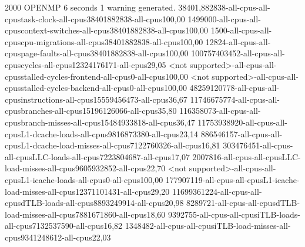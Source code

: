 
2000
OPENMP
6 seconds
1 warning generated.
38401,882838-all-cpus-all-cpustask-clock-all-cpus38401882838-all-cpus100,00
1499000-all-cpus-all-cpuscontext-switches-all-cpus38401882838-all-cpus100,00
1500-all-cpus-all-cpuscpu-migrations-all-cpus38401882838-all-cpus100,00
12824-all-cpus-all-cpuspage-faults-all-cpus38401882838-all-cpus100,00
100757403452-all-cpus-all-cpuscycles-all-cpus12324176171-all-cpus29,05
<not supported>-all-cpus-all-cpusstalled-cycles-frontend-all-cpus0-all-cpus100,00
<not supported>-all-cpus-all-cpusstalled-cycles-backend-all-cpus0-all-cpus100,00
48259120778-all-cpus-all-cpusinstructions-all-cpus15559456473-all-cpus36,67
11746675774-all-cpus-all-cpusbranches-all-cpus15196126066-all-cpus35,80
116358073-all-cpus-all-cpusbranch-misses-all-cpus15484933818-all-cpus36,47
11753938920-all-cpus-all-cpusL1-dcache-loads-all-cpus9816873380-all-cpus23,14
886546157-all-cpus-all-cpusL1-dcache-load-misses-all-cpus7122760326-all-cpus16,81
303476451-all-cpus-all-cpusLLC-loads-all-cpus7223804687-all-cpus17,07
2007816-all-cpus-all-cpusLLC-load-misses-all-cpus9605932852-all-cpus22,70
<not supported>-all-cpus-all-cpusL1-icache-loads-all-cpus0-all-cpus100,00
177907119-all-cpus-all-cpusL1-icache-load-misses-all-cpus12371101431-all-cpus29,20
11699361224-all-cpus-all-cpusdTLB-loads-all-cpus8893249914-all-cpus20,98
8289721-all-cpus-all-cpusdTLB-load-misses-all-cpus7881671860-all-cpus18,60
9392755-all-cpus-all-cpusiTLB-loads-all-cpus7132537590-all-cpus16,82
1348482-all-cpus-all-cpusiTLB-load-misses-all-cpus9341248612-all-cpus22,03
